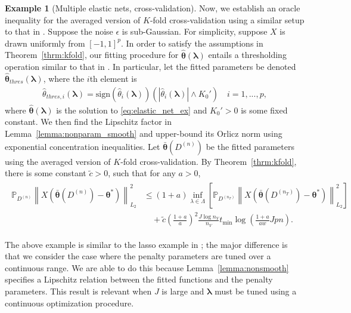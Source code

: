 \documentclass[12pt]{article} %
\theoremstyle{definition}
\newtheorem{example}{Example}
\begin{document}
\begin{example}[Multiple elastic nets, cross-validation]
	\label{eq:elastic_net_cv}
	Now, we establish an oracle inequality for the averaged version of $K$-fold cross-validation using a similar setup to that in \citet{lecue2012oracle}.
	Suppose the noise $\epsilon$ is sub-Gaussian.
	For simplicity, suppose $X$ is drawn uniformly from $[-1, 1]^p$.
	In order to satisfy the assumptions in Theorem~\ref{thrm:kfold}, our fitting procedure for $\hat{\boldsymbol{\theta}}(\boldsymbol{\lambda})$ entails a thresholding operation similar to that in \citet{lecue2012oracle}.
	In particular, let the fitted parameters be denoted $\hat{\boldsymbol{\theta}}_{thres}(\boldsymbol{\lambda})$, where the $i$th element is
	\begin{align}
	\hat{{\theta}}_{thres, i}(\boldsymbol{\lambda})
	= \text{sign}(\hat{{\theta}}_{i}(\boldsymbol{\lambda}))
	(|\hat{{\theta}}_{i}(\boldsymbol{\lambda})| \wedge K_0')
	\quad i = 1,...,p,
	\label{eq:threshold_elastic_net}
	\end{align}
	where $\hat{\boldsymbol{\theta}}(\boldsymbol{\lambda})$ is the solution to \eqref{eq:elastic_net_ex} and $K_0' > 0$ is some fixed constant.
	We then find the Lipschitz factor in Lemma~\ref{lemma:nonparam_smooth} and upper-bound its Orlicz norm using exponential concentration inequalities.
	Let $\bar{\boldsymbol{\theta}}(D^{(n)})$ be the fitted parameters using the averaged version of $K$-fold cross-validation.
	By Theorem~\ref{thrm:kfold}, there is some constant $\tilde{c} > 0$, such that for any $a > 0$,
	\begin{align}
	\begin{split}
	\mathbb{P}_{D^{(n)}}
	\left \|
	X \left(
	\bar{\boldsymbol{\theta}}(D^{(n)})
	- \boldsymbol{\theta}^*
	\right)
	\right \|_{L_{2}}^{2}
	& \le	(1+a)
	\inf_{\lambda\in\Lambda}
	\left[
	\mathbb{P}_{D^{(n_{T})}}
	\left \|
	X \left(
	\bar{\boldsymbol{\theta}}(D^{(n_T)})
	- \boldsymbol{\theta}^*
	\right)
	\right \|_{L_{2}}^{2}
	\right] \\
	& \quad +
	\tilde{c}
	\left (\frac{1+a}{a} \right )^2
	\frac{J \log n_{V}}{n_{V}}
	t_{\min}
	\log\left(
	\frac{1+a}{aw} Jpn
	\right).
	\end{split}
	\end{align}

\noindent The above example is similar to the lasso example in \citet{lecue2012oracle}; the major difference is that we consider the case where the penalty parameters are tuned over a continuous range.
We are able to do this because Lemma~\ref{lemma:nonsmooth} specifies a Lipschitz relation between the fitted functions and the penalty parameters.
This result is relevant when $J$ is large and $\boldsymbol{\lambda}$ must be tuned using a continuous optimization procedure.
\end{example}
\end{document}
